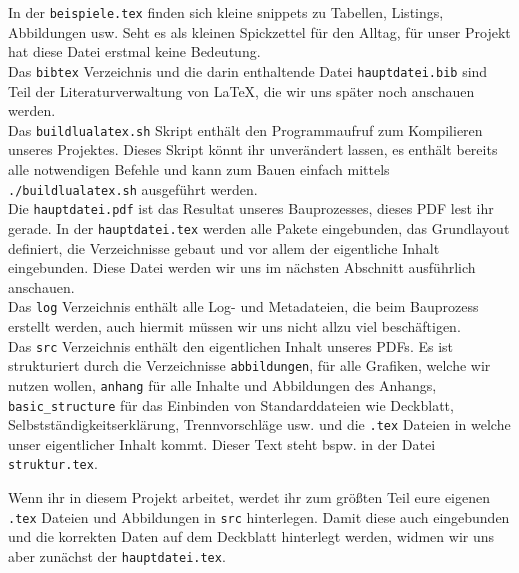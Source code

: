 In der \texttt{beispiele.tex} finden sich kleine snippets zu Tabellen, Listings,
Abbildungen usw. Seht es als kleinen Spickzettel für den Alltag, für unser
Projekt hat diese Datei erstmal keine Bedeutung.\\ Das \texttt{bibtex}
Verzeichnis und die darin enthaltende Datei \texttt{hauptdatei.bib} sind Teil der
Literaturverwaltung von \LaTeX, die wir uns später noch anschauen werden.\\ Das
\texttt{buildlualatex.sh} Skript enthält den Programmaufruf zum Kompilieren
unseres Projektes. Dieses Skript könnt ihr unverändert lassen, es enthält
bereits alle notwendigen Befehle und kann zum Bauen einfach mittels
\texttt{./buildlualatex.sh} ausgeführt werden.\\ Die \texttt{hauptdatei.pdf} ist
das Resultat unseres Bauprozesses, dieses PDF lest ihr gerade. In der
\texttt{haupt\-da\-tei\-.tex} werden alle Pakete eingebunden, das Grundlayout
definiert, die Verzeichnisse gebaut und vor allem der eigentliche Inhalt
eingebunden. Diese Datei werden wir uns im nächsten Abschnitt ausführlich
anschauen.\\ Das \texttt{log} Verzeichnis enthält alle Log- und Metadateien, die
beim Bauprozess erstellt werden, auch hiermit müssen wir uns nicht allzu viel
beschäftigen.\\ Das \texttt{src} Verzeichnis enthält den eigentlichen Inhalt
unseres PDFs. Es ist strukturiert durch die Verzeichnisse \texttt{abbildungen},
für alle Grafiken, welche wir nutzen wollen, \texttt{anhang} für alle Inhalte
und Abbildungen des Anhangs, \texttt{basic\_structure} für das Einbinden von
Standarddateien wie Deckblatt, Selbstständigkeitserklärung, Trennvorschläge usw.
und die \texttt{.tex} Dateien in welche unser eigentlicher Inhalt kommt. Dieser
Text steht bspw. in der Datei \texttt{struktur.tex}.

Wenn ihr in diesem Projekt arbeitet, werdet ihr zum größten Teil eure eigenen
\texttt{.tex} Dateien und Abbildungen in \texttt{src} hinterlegen. Damit diese
auch eingebunden und die korrekten Daten auf dem Deckblatt hinterlegt werden,
widmen wir uns aber zunächst der \texttt{hauptdatei.tex}.

